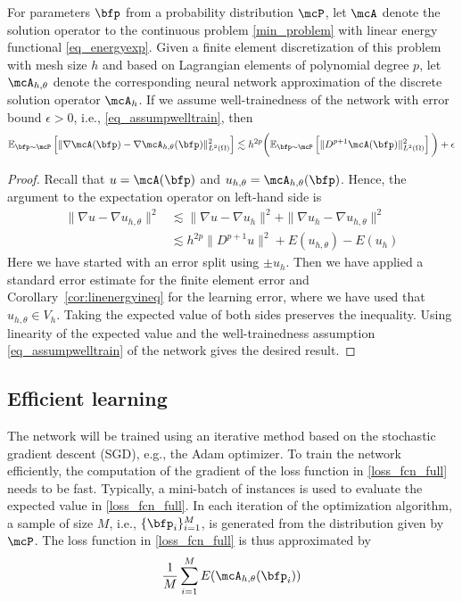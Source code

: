 \documentclass[12pt]{article}
\begin{document}
\begin{prop}\label{prp:energyerror}
For parameters $\bfp$ from a probability distribution $\mcP$, let $\mcA$ denote the solution operator to the continuous problem \eqref{min_problem} with linear energy functional \eqref{eq_energyexp}. Given a finite element discretization of this problem with mesh size $h$ and based on Lagrangian elements of polynomial degree $p$, let $\mcA_{h,\theta}$ denote the corresponding neural network approximation of the discrete solution operator $\mcA_h$. If we assume well-trainedness of the network with error bound $\epsilon > 0$, i.e., \eqref{eq_assumpwelltrain}, then
\begin{align}
	\mathbb{E}_{\bfp \sim \mcP} \left[ \| \nabla \mcA(\bfp) - \nabla \mcA_{h,\theta}(\bfp) \|_{L^2(\Omega)}^2 \right] \lesssim h^{2p} \bigg( \mathbb{E}_{\bfp \sim \mcP} \left[ \| D^{p+1} \mcA (\bfp) \|_{L^2(\Omega)}^2 \right] \bigg) + \epsilon
\end{align}
\begin{proof}
Recall that $u = \mcA(\bfp)$ and $u_{h,\theta} = \mcA_{h,\theta}(\bfp)$. Hence,
the argument to the expectation operator on left-hand side is
\begin{equation}
\begin{aligned}
	\| \nabla u - \nabla u_{h,\theta} \|^2 &\lesssim \| \nabla u - \nabla u_{h} \|^2 + \| \nabla u_h - \nabla u_{h,\theta} \|^2  \\
					       &\lesssim h^{2p} \| D^{p+1} u \|^2 + E(u_{h,\theta}) - E(u_{h})
\end{aligned}
\end{equation}
Here we have started with an error split using $\pm u_{h}$. Then we have applied a standard error estimate for the finite element error and Corollary~\ref{cor:linenergyineq}
for the learning error, where we have used that $u_{h,\theta} \in V_h$. Taking the expected value of both sides preserves the inequality. Using linearity of the expected value and the well-trainedness assumption \eqref{eq_assumpwelltrain} of the network gives the desired result.
\end{proof}
\end{prop}

\subsection{Efficient learning}  \label{sec_efflearn}
The network will be trained using an iterative method based on the stochastic gradient descent (SGD), e.g., the Adam optimizer. To train the network efficiently, the computation of the gradient of the loss function in \eqref{loss_fcn_full} needs to be fast. Typically, a mini-batch of instances is used to evaluate the expected value in \eqref{loss_fcn_full}. In each iteration of the optimization algorithm, a sample of size $M$, i.e., $\{\bfp_i\}_{i=1}^M$, is generated from the distribution given by $\mcP$. The loss function in \eqref{loss_fcn_full} is thus approximated by
\begin{align}
	\frac{1}{M}\sum_{i=1}^M E(\mcA_{h,\theta}(\bfp_i)) \label{loss_fcn_batch}
\end{align}
\end{document}
